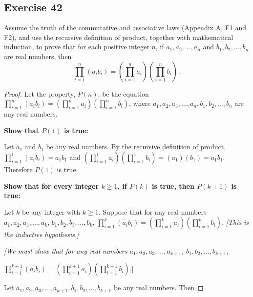 \documentclass[14pt]{extarticle}
\newcommand{\dps}{\displaystyle}
\begin{document}
    \subsection{Exercise 42}
    Assume the truth of the commutative and associative laws (Appendix A, F1 and F2), and use the recursive definition
    of product, together with mathematical induction, to prove that for each positive integer $n$, if $a_1, a_2, \ldots,
a_n$ and $b_1, b_2, \ldots, b_n$ are real numbers, then
    \[
        \prod_{i = 1}^{n}(a_i b_i) = \left(\prod_{i = 1}^{n} a_i \right) \left(\prod_{i = 1}^{n} b_i \right) \,.
    \]
    \begin{proof}
        Let the property, $P(n)$, be the equation \(\prod_{i = 1}^{n}(a_i b_i) = \left(\prod_{i = 1}^{n} a_i \right) \left
        (\prod_{i = 1}^{n} b_i \right)\), where \(a_1, a_2, a_3, \ldots, a_n, b_1, b_2, \ldots, b_n\) are any real numbers.

            {\bf Show that $P(1)$ is true:}

        Let $a_1$ and $b_1$ be any real numbers. By the recursive
        definition of product, \(\dps \prod_{i=1}^1 (a_i b_i) = a_1
        b_1\) and \(\dps \left(\prod_{i = 1}^{1} a_i \right) \left
        (\prod_{i = 1}^{1} b_i \right) = (a_1)(b_1) = a_1 b_1\).
        Therefore $P(1)$ is true.

            {\bf Show that for every integer \(k \geq 1\), if $P(k)$ is true, then \(P(k + 1)\) is true:}

        Let $k$ be any integer with \(k \geq 1\). Suppose that for any real numbers \(a_1, a_2, a_3, \ldots, a_k\), \(b_1,
        b_2, b_3, \ldots, b_k\), \(\prod_{i = 1}^{k}(a_i b_i) = \left (\prod_{i = 1}^{k} a_i \right) \left (\prod_{i = 1}
        ^{k} b_i \right)\). {\it [This is the inductive hypothesis.]}

            {\it [We must show that for any real numbers \(a_1, a_2, a_3, \ldots, a_{k+1}\), \(b_1, b_2, \ldots, b_{k+1}\),

                    \(\prod_{i = 1}^{k+1}(a_i b_i) = \left(\prod_{i = 1}^{k+1} a_i \right) \left (\prod_{i = 1}^{k+1} b_i \right)\).]}

        Let \(a_1, a_2, a_3, \ldots, a_{k+1}, b_1, b_2, \ldots, b_{k+1}\) be any real numbers. Then


\end{proof}
\end{document}

